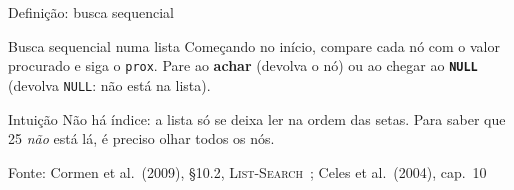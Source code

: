 \documentclass[aspectratio=169]{beamer}
\newcommand{\ptr}[1]{($(#1.one split north)!0.5!(#1.south east)$)}
\newcommand{\fonte}[1]{\vfill\hfill{\scriptsize\textcolor{UFSGray}{Fonte: #1}}}
\begin{document}
\begin{frame}{Definição: busca sequencial}
  \begin{block}{Busca sequencial numa lista}
    \small Começando no início, compare cada nó com o valor procurado e siga
    o \texttt{prox}. Pare ao \textbf{achar} (devolva o nó) ou ao chegar ao
    \textbf{\texttt{NULL}} (devolva \texttt{NULL}: não está na lista).
  \end{block}
  \begin{center}
  \end{center}
  \begin{exampleblock}{Intuição}
    \small Não há índice: a lista só se deixa ler na ordem das setas. Para
    saber que 25 \emph{não} está lá, é preciso olhar todos os nós.
  \end{exampleblock}
  \fonte{Cormen et al.\ (2009), §10.2, \textsc{List-Search}~\cite{cormen2009introduction};
    Celes et al.\ (2004), cap.~10~\cite{celes2004introducao}}
\end{frame}
\end{document}
